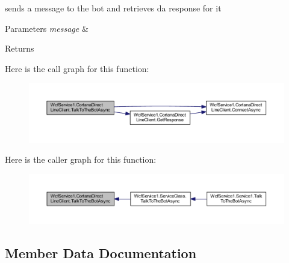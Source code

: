 sends a message to the bot and retrieves da response for it 


\begin{DoxyParams}{Parameters}
{\em message} & \\
\hline
\end{DoxyParams}
\begin{DoxyReturn}{Returns}

\end{DoxyReturn}


Here is the call graph for this function\+:\nopagebreak
\begin{figure}[H]
\begin{center}
\leavevmode
\includegraphics[width=350pt]{class_wcf_service1_1_1_cortana_direct_line_client_ad9aee7d49dab0e3bb8806349b68716b3_cgraph}
\end{center}
\end{figure}




Here is the caller graph for this function\+:\nopagebreak
\begin{figure}[H]
\begin{center}
\leavevmode
\includegraphics[width=350pt]{class_wcf_service1_1_1_cortana_direct_line_client_ad9aee7d49dab0e3bb8806349b68716b3_icgraph}
\end{center}
\end{figure}




\subsection{Member Data Documentation}
